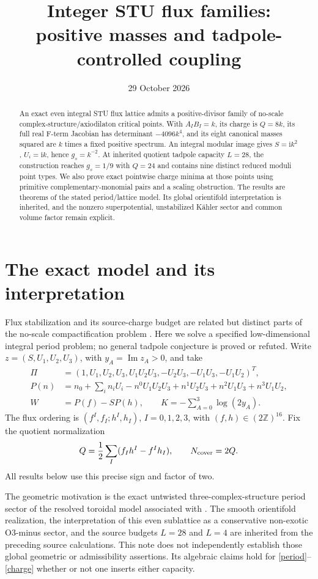 \documentclass[11pt]{article}
\author{}
\date{29 October 2026}
\title{Integer STU flux families:\\positive masses and tadpole-controlled coupling}
\newcommand{\ii}{\mathrm{i}}
\newcommand{\Z}{\mathbb Z}
\newcommand{\Imn}{\operatorname{Im}}
\begin{document}
\maketitle
\begin{abstract}
An exact even integral STU flux lattice admits a positive-divisor family of
no-scale complex-structure/axiodilaton critical points. With $A_IB_I=k$, its
charge is $Q=8k$, its full real F-term Jacobian has determinant $-4096k^4$,
and its eight canonical masses squared are $k$ times a fixed positive
spectrum. An integral modular image gives $S=\ii k^2$, $U_i=\ii k$, hence
$g_s=k^{-2}$. At inherited quotient tadpole capacity $L=28$, the construction
reaches $g_s=1/9$ with $Q=24$ and contains nine distinct reduced moduli point
types. We also prove exact pointwise charge minima at those points using
primitive complementary-monomial pairs and a scaling obstruction. The
results are theorems of the stated period/lattice model. Its global
orientifold interpretation is inherited, and the nonzero superpotential,
unstabilized K\"ahler sector and common volume factor remain explicit.
\end{abstract}

\section{The exact model and its interpretation}
Flux stabilization and its source-charge budget are related but distinct
parts of the no-scale compactification problem
\citep{GKP,DenefEtAl,BenaEtAl}. Here we solve a specified low-dimensional
integral period problem; no general tadpole conjecture is proved or refuted.
Write $z=(S,U_1,U_2,U_3)$, with $y_A=\Imn z_A>0$, and take
\begin{align}
\Pi&=(1,U_1,U_2,U_3,U_1U_2U_3,-U_2U_3,-U_1U_3,-U_1U_2)^T,\label{period}\\
P(n)&=n_0+\sum_i n_iU_i-n^0U_1U_2U_3
       +n^1U_2U_3+n^2U_1U_3+n^3U_1U_2,\\
W&=P(f)-SP(h),\qquad K=-\sum_{A=0}^3\log(2y_A).
\end{align}
The flux ordering is $(f^I,f_I;h^I,h_I)$, $I=0,1,2,3$, with
$(f,h)\in(2\Z)^{16}$. Fix the quotient normalization
\begin{equation}
Q=\frac12\sum_I(f_Ih^I-f^Ih_I),\qquad N_{\rm cover}=2Q.
\label{charge}
\end{equation}
All results below use this precise sign and factor of two.

The geometric motivation is the exact untwisted three-complex-structure
period sector of the resolved toroidal model associated with
\citet{DenefEtAl}. The smooth orientifold realization, the interpretation of
this even sublattice as a conservative non-exotic O3-minus sector, and the
source budgets $L=28$ and $L=4$ are inherited from the preceding source
calculations. This note does not independently establish those global
geometric or admissibility assertions. Its algebraic claims hold for
\eqref{period}--\eqref{charge} whether or not one inserts either capacity.
\end{document}
